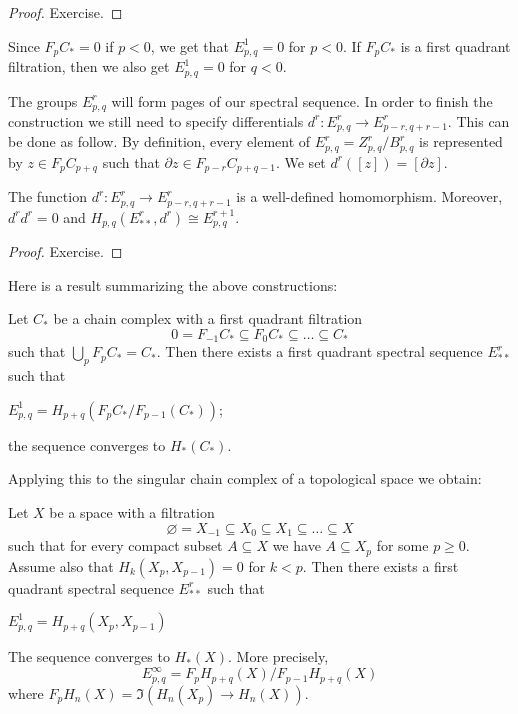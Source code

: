 \begin{proof}
Exercise.
\end{proof}

\begin{note}
Since $F_{p}C_{\ast} = 0$ if $p< 0$, we get that $E^{1}_{p, q} = 0$ for $p< 0$. 
If $F_{p}C_{\ast}$ is a first quadrant filtration, then we also get 
$E^{1}_{p, q} = 0$ for $q<0$. 
\end{note}


The groups $E^{r}_{p, q}$ will form pages of our spectral sequence. In order to finish 
the construction we still need to specify differentials 
$d^{r}\colon E^{r}_{p, q} \to E^{r}_{p-r, q+r-1}$. This can be done as follow. 
By definition, every element of $E^{r}_{p, q} = Z^{r}_{p, q}/B^{r}_{p, q}$ 
is represented by $z \in F_{p}C_{p+q}$ such that $\partial z\in F_{p-r}C_{p+q-1}$. 
We set $d^{r}([z]) = [\partial z]$. 

\begin{proposition}
The function $d^{r}\colon E^{r}_{p, q} \to E^{r}_{p-r, q+r-1}$ is a well-defined 
homomorphism. Moreover, $d^{r}d^{r} = 0$ and 
$H_{p, q}(E^{r}_{\ast\ast}, d^{r}) \cong E^{r+1}_{p, q}$.
\end{proposition}

\begin{proof}
Exercise.
\end{proof}

Here is a result summarizing the above constructions:

\begin{theorem}
\label{CHAIN COMPLEX FILTRATION SS THM}
Let $C_{\ast}$ be a chain complex with a first quadrant filtration 
\[
0 = F_{-1}C_{\ast} \subseteq F_{0}C_{\ast} \subseteq {\dots} \subseteq  C_{\ast}
\] 
such that $\bigcup_{p}F_{p}C_{\ast} = C_{\ast}$.
Then there exists a first quadrant spectral sequence $E^{r}_{\ast\ast}$ such that 
\bit 
\item $E^{1}_{p, q} = H_{p+q}(F_{p}C_{\ast}/F_{p-1}(C_{\ast}))$;
\item the sequence converges to $H_{\ast}(C_{\ast})$.
\eit
\end{theorem}

Applying this to the singular chain 
complex of a topological space we obtain: 

\begin{theorem}
\label{SPACE FILTRATION SS THM}
Let $X$ be a space with a filtration 
\[
\varnothing = X_{-1} \subseteq X_{0} \subseteq X_{1} \subseteq {\dots} \subseteq X
\] 
such that for every compact subset $A\subseteq X$ we have $A\subseteq X_{p}$
for some $p\geq 0$. Assume also that $H_{k}(X_{p}, X_{p-1}) = 0$ for $k<p$. 
Then there exists a first quadrant spectral sequence $E^{r}_{\ast\ast}$ such that 
\bit 
\item $E^{1}_{p, q} = H_{p+q}(X_{p}, X_{p-1})$
\item The sequence converges to $H_{\ast}(X)$. More precisely, 
\[
E^{\infty}_{p, q} = F_{p}H_{p+q}(X)/F_{p-1}H_{p+q}(X)
\]
where $F_{p}H_{n}(X) = \Im(H_{n}(X_{p}) \to H_{n}(X))$.
\eit
\end{theorem}

